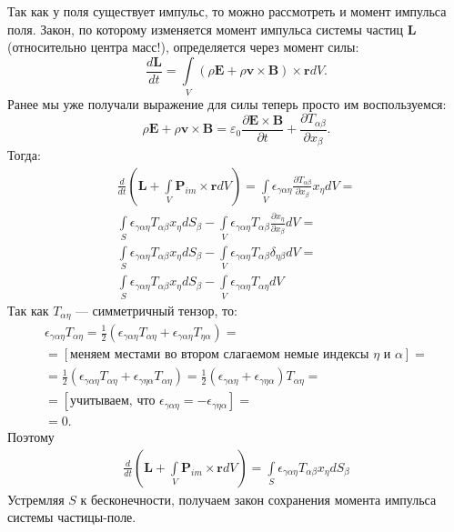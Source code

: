 \documentclass[a4paper,14pt]{extreport} %
\newcommand{\dff}[2]{\frac{\partial #1}{\partial #2}}
\newcommand{\Df}[1]{\frac{d}{d #1}}
\newcommand{\Dff}[2]{\frac{d #1}{d #2}}
\renewcommand{\vec}[1]{\bm{#1}}
\newcommand{\eps}{\varepsilon}
\begin{document}
	Так как у поля существует импульс, то можно рассмотреть и момент импульса поля. Закон, по которому изменяется момент импульса системы частиц $\vec{L}$ (относительно центра масс!), определяется через момент силы:
	\begin{equation*}
		\Dff{\vec{L}}{t} =
		\int\limits_{V} (\rho \vec{E} + \rho \vec{v}\times\vec{B} )\times \vec{r} dV.
	\end{equation*}
	Ранее мы уже получали выражение для силы теперь просто им воспользуемся:
	\begin{equation*}
		\rho \vec{E} + \rho \vec{v}\times\vec{B} = 
		\eps_0 \dff{\vec{E}\times\vec{B}}{t} + \dff{T_{\alpha\beta}}{x_\beta}.
	\end{equation*}
	Тогда:
	\begin{equation*}
	\begin{gathered}
	\Df{t} \left(\vec{L} + \int\limits_{V} \vec{P}_{im}\times\vec{r} dV\right) =
	\int\limits_{V} \epsilon_{\gamma\alpha\eta} \dff{T_{\alpha\beta}}{x_\beta} x_\eta dV = \\
	\int\limits_{S} \epsilon_{\gamma\alpha\eta} T_{\alpha\beta} x_\eta dS_\beta -
	\int\limits_{V} \epsilon_{\gamma\alpha\eta} T_{\alpha\beta}\dff{x_\eta}{x_\beta} dV = \\
	\int\limits_{S} \epsilon_{\gamma\alpha\eta} T_{\alpha\beta} x_\eta dS_\beta -
	\int\limits_{V} \epsilon_{\gamma\alpha\eta} T_{\alpha\beta}\delta_{\eta\beta} dV = \\
	\int\limits_{S} \epsilon_{\gamma\alpha\eta} T_{\alpha\beta} x_\eta dS_\beta -
	\int\limits_{V} \epsilon_{\gamma\alpha\eta} T_{\alpha\eta} dV
	\end{gathered}
	\end{equation*}
	Так как $T_{\alpha\eta}$ --- симметричный тензор, то:
	\begin{equation*}
		\begin{gathered}
		\epsilon_{\gamma\alpha\eta} T_{\alpha\eta} = \frac{1}{2} (\epsilon_{\gamma\alpha\eta} T_{\alpha\eta} + \epsilon_{\gamma\alpha\eta} T_{\eta\alpha}) = \\ 
		= [\text{меняем местами во втором слагаемом немые индексы $\eta$ и $\alpha$}] =  \\ = \frac{1}{2} (\epsilon_{\gamma\alpha\eta} T_{\alpha\eta} + \epsilon_{\gamma\eta\alpha} T_{\alpha\eta}) = \frac{1}{2} (\epsilon_{\gamma\alpha\eta}+ \epsilon_{\gamma\eta\alpha} ) T_{\alpha\eta} = \\ =
		[\text{учитываем, что $\epsilon_{\gamma\alpha\eta} = - \epsilon_{\gamma\eta\alpha}$}] = \\
		= 0.
		\end{gathered}
	\end{equation*}
	Поэтому
	\begin{equation*}
	\begin{gathered}
	\Df{t} \left(\vec{L} + \int\limits_{V} \vec{P}_{im}\times\vec{r} dV\right) =
	\int\limits_{S} \epsilon_{\gamma\alpha\eta} T_{\alpha\beta} x_\eta dS_\beta
	\end{gathered}
	\end{equation*}
	Устремляя $S$ к бесконечности, получаем закон сохранения момента импульса системы частицы-поле.
	
\end{document}
